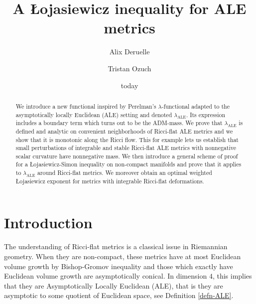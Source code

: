 \documentclass[a4paper,11pt,reqno]{amsart}
\numberwithin{equation}{section}
\begin{document}
	\title{A \L{}ojasiewicz inequality for ALE metrics}
	\date{today}
\author{Alix Deruelle}
\address{Institut de math\'ematiques de Jussieu, 4, place Jussieu, Boite Courrier 247 - 75252 Paris}
\author{Tristan Ozuch}
\address{École Normale Supérieure, PSL Université, 45 rue d'Ulm - 75005 Paris}
	\maketitle
	
	
	\begin{abstract}
		We introduce a new functional inspired by Perelman's $\lambda$-functional adapted to the asymptotically locally Euclidean (ALE) setting and denoted $\lambda_{\operatorname{ALE}}$. Its expression includes a boundary term which turns out to be the ADM-mass. We prove that $\lambda_{\operatorname{ALE}}$ is defined and analytic on convenient neighborhoods of Ricci-flat ALE metrics and we show that it is monotonic along the Ricci flow. This for example lets us establish that small perturbations of integrable and stable Ricci-flat ALE metrics with nonnegative scalar curvature have nonnegative mass. We then introduce a general scheme of proof for a \L{}ojasiewicz-Simon inequality on non-compact manifolds and prove that it applies to $\lambda_{\operatorname{ALE}}$ around Ricci-flat metrics. We moreover obtain an optimal weighted \L{}ojasiewicz exponent for metrics with integrable Ricci-flat deformations. 
	\end{abstract}
	\tableofcontents
	
	\section*{Introduction}
	
	The understanding of Ricci-flat metrics is a classical issue in Riemannian geometry. When they are non-compact, these metrics have at most Euclidean volume growth by Bishop-Gromov inequality and those which exactly have Euclidean volume growth are asymptotically conical. In dimension $4$, this implies that they are Asymptotically Locally Euclidean (ALE), that is they are asymptotic to some quotient of Euclidean space, see Definition \ref{defn-ALE}. 
	
\end{document}
